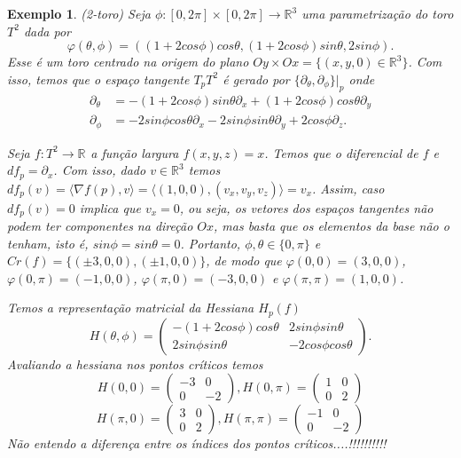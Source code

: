 \documentclass[12pt]{book}
\newtheorem{exemplo}[teorema]{Exemplo}
\newcommand{\derivadaparcialabrev}[1]{\partial_{#1}}
\newcommand{\pontoscriticos}[1]{\textit{Cr}(#1)}
\newcommand{\produtointerno}[2]{\langle #1, #2 \rangle}
\newcommand{\real}[1]{\mathbb{R}^{#1}}
\newcommand{\reta}{\real{}}
\newcommand{\vermelho}[1]{{\color{red}#1}}
\begin{document}
	\begin{exemplo}
		(2-toro) Seja $\phi:[0,2\pi]\times [0,2\pi] \to \real{3}$ uma parametrização do toro $T^{2}$ dada por
		$$
		\varphi(\theta, \phi) = ((1+2cos\phi)cos\theta, (1+2cos\phi)sin\theta, 2sin\phi).
		$$
		Esse é um toro centrado na origem do plano $Oy\times Ox = \{(x, y ,0) \in \real{3}\}$. Com isso, temos que o espaço tangente $T_{p}T^{2} $ é gerado por $ \{\derivadaparcialabrev{\theta}, \derivadaparcialabrev{\phi} \}|_{p}$ onde
		$$
		\begin{aligned}
		\derivadaparcialabrev{\theta} &= -(1+2cos\phi)sin\theta \derivadaparcialabrev{x}+(1+2cos\phi)cos\theta \derivadaparcialabrev{y} 
		\\
		\derivadaparcialabrev{\phi} &=  - 2sin\phi cos\theta 	\derivadaparcialabrev{x} - 2sin\phi sin\theta 	\derivadaparcialabrev{y} +2cos\phi				\derivadaparcialabrev{z}.
		\end{aligned} 
		$$
		
		
		Seja $f:T^{2} \to \reta$ a função largura $f(x,y,z)=x$. Temos que o diferencial de $f$ e $df_{p} = \derivadaparcialabrev{x}$. Com isso, dado $v \in \real{3}$ temos $df_{p}(v) = \produtointerno{\nabla f(p)}{v}  = \produtointerno{(1,0,0)}{(v_{x}, v_{y}, v_{z})} =v_{x}$. Assim, caso $df_{p}(v) = 0$ implica que $v_{x} = 0$, ou seja, os vetores dos espaços tangentes não podem ter componentes na direção $Ox$, mas basta que os elementos da base não o tenham, isto é, $sin\phi = sin\theta = 0$. Portanto, $\phi, \theta \in \{0, \pi\}$ e $\pontoscriticos{f} = \{(\pm 3,0,0), (\pm 1,0,0)\}$, de modo que $\varphi(0,0) = (3,0,0)$, $\varphi(0,\pi) = (-1,0,0)$, $\varphi(\pi,0) = (-3,0,0)$ e $\varphi(\pi,\pi) = (1,0,0)$.
		
		Temos a representação matricial da Hessiana $H_{p}(f)$
		$$
		H(\theta, \phi) = 
		\left(
		\begin{array}{cc}
		-(1+2cos\phi)cos\theta & 2sin\phi sin\theta  
		\\
		2sin\phi sin\theta   & -2cos\phi cos\theta  
		\end{array}
		\right).
		$$
		Avaliando a hessiana nos pontos críticos temos
		$$
		H(0, 0) = 
		\left(
		\begin{array}{cc}
		-3 & 0
		\\
		0& -2
		\end{array}
		\right),
		H(0, \pi) = 
		\left(
		\begin{array}{cc}
		1 & 0
		\\
		0& 2
		\end{array}
		\right)
		$$
		$$
		H(\pi, 0) = 
		\left(
		\begin{array}{cc}
		3 & 0
		\\
		0& 2
		\end{array}
		\right),
		H(\pi, \pi) = 
		\left(
		\begin{array}{cc}
		-1 & 0
		\\
		0& -2
		\end{array}
		\right)
		$$
		\vermelho{Não entendo a diferença entre os índices dos pontos críticos....!!!!!!!!!!}
	\end{exemplo}
	
\end{document}
